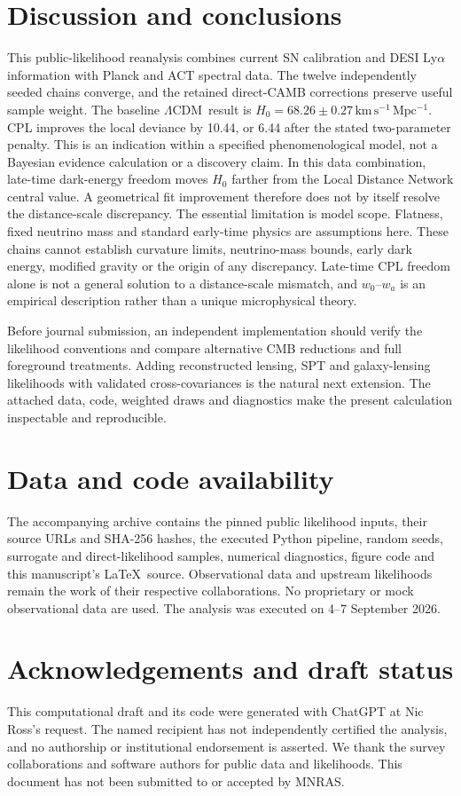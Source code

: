 \documentclass[fleqn,usenatbib]{mnras}
\newcommand{\lcdm}{$\Lambda$CDM}
\newcommand{\hunit}{\mathrm{km\,s^{-1}\,Mpc^{-1}}}
\begin{document}
\section{Discussion and conclusions}
This public-likelihood reanalysis combines current SN calibration and DESI Ly$\alpha$ information with Planck and ACT spectral data. The twelve independently seeded chains converge, and the retained direct-CAMB corrections preserve useful sample weight. The baseline \lcdm\ result is $H_0=68.26\pm0.27\,\hunit$. CPL improves the local deviance by 10.44, or 6.44 after the stated two-parameter penalty. This is an indication within a specified phenomenological model, not a Bayesian evidence calculation or a discovery claim. In this data combination, late-time dark-energy freedom moves $H_0$ farther from the Local Distance Network central value. A geometrical fit improvement therefore does not by itself resolve the distance-scale discrepancy. 
The essential limitation is model scope. Flatness, fixed neutrino mass and
standard early-time physics are assumptions here. These chains cannot establish
curvature limits, neutrino-mass bounds, early dark energy, modified gravity or
the origin of any discrepancy. Late-time CPL freedom alone is not a general
solution to a distance-scale mismatch, and $w_0$--$w_a$ is an empirical
description rather than a unique microphysical theory.

Before journal submission, an independent implementation should verify the
likelihood conventions and compare alternative CMB reductions and full
foreground treatments. Adding reconstructed lensing, SPT and galaxy-lensing
likelihoods with validated cross-covariances is the natural next extension.
The attached data, code, weighted draws and diagnostics make the present
calculation inspectable and reproducible.

\section*{Data and code availability}
The accompanying archive contains the pinned public likelihood inputs, their
source URLs and SHA-256 hashes, the executed Python pipeline, random seeds,
surrogate and direct-likelihood samples, numerical diagnostics, figure code and
this manuscript's \LaTeX\ source. Observational data and upstream likelihoods
remain the work of their respective collaborations. No proprietary or mock
observational data are used. The analysis was executed on 4--7 September 2026.

\section*{Acknowledgements and draft status}
This computational draft and its code were generated with ChatGPT at Nic
Ross's request. The named recipient has not independently certified the
analysis, and no authorship or institutional endorsement is asserted. We thank
the survey collaborations and software authors for public data and likelihoods.
This document has not been submitted to or accepted by MNRAS.
\end{document}
